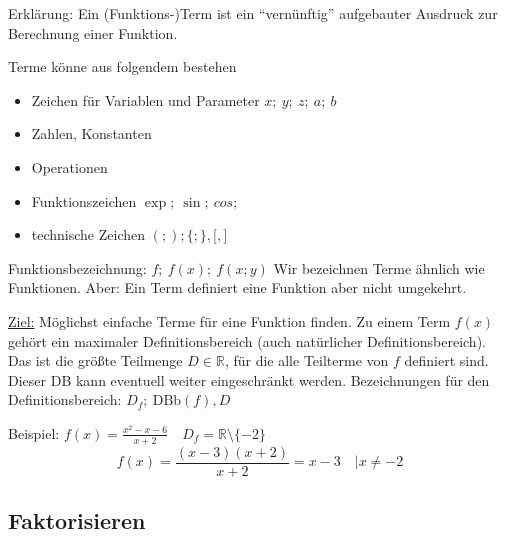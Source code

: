 Erklärung: Ein (Funktions-)Term ist ein ``vernünftig'' aufgebauter Ausdruck zur Berechnung einer Funktion.

Terme könne aus folgendem bestehen
\begin{itemize}
    \item Zeichen für Variablen und Parameter $x;\ y;\ z;\ a;\ b$
    \item Zahlen, Konstanten
    \item Operationen
    \item Funktionszeichen $\exp;\ \sin;\ cos;\ $
    \item technische Zeichen $(;);\lbrace;\rbrace,\lbrack,\rbrack$
\end{itemize}
Funktionsbezeichnung: $f;\ f(x);\ f(x;y)$ Wir bezeichnen Terme ähnlich wie Funktionen.
Aber: Ein Term definiert eine Funktion aber nicht umgekehrt.


\underline{Ziel:} Möglichst einfache Terme für eine Funktion finden.
Zu einem Term $f(x)$ gehört ein maximaler Definitionsbereich (auch natürlicher Definitionsbereich).
Das ist die größte Teilmenge $D \in \mathbb{R}$, für die alle Teilterme von $f$ definiert sind.
Dieser DB kann eventuell weiter eingeschränkt werden.
Bezeichnungen für den Definitionsbereich: $D_f;\ \textrm{DBb}(f), D$


Beispiel: $f(x) = \frac{x^2-x-6}{x+2}\quad D_f=\mathbb{R}\setminus\lbrace-2\rbrace$
\[f(x)= \frac{(x-3)(x+2)}{x+2} = x-3\quad | x \not = -2\]

\subsection{Faktorisieren}\label{subsec:umformungen-von-termen_faktorisieren}

